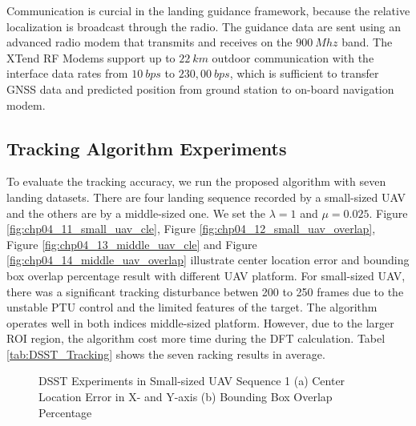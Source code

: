 \documentclass[journal,article,submit,moreauthors,pdftex,10pt,a4paper]{mdpi}
\begin{document}
Communication is curcial in the landing guidance framework, because the relative localization is broadcast through the radio. The guidance data are sent using an advanced radio modem that transmits and receives on the $900\ Mhz$ band. The XTend RF Modems support up to $22\ km$ outdoor communication with the interface data rates from $10\ bps$ to $230,00\ bps$, which is sufficient to transfer GNSS data and predicted position from ground station to on-board navigation modem. 


\subsection{Tracking Algorithm Experiments}
To evaluate the tracking accuracy, we run the proposed algorithm with seven landing datasets. There are four landing sequence recorded by a small-sized UAV and the others are by a middle-sized one. We set the $\lambda=1$ and $\mu=0.025$. Figure \ref{fig:chp04_11_small_uav_cle}, Figure \ref{fig:chp04_12_small_uav_overlap}, Figure \ref{fig:chp04_13_middle_uav_cle} and Figure \ref{fig:chp04_14_middle_uav_overlap} illustrate center location error and bounding box overlap percentage result with different UAV platform. For small-sized UAV, there was a significant tracking disturbance betwen 200 to 250 frames due to the unstable PTU control and the limited features of the target. The algorithm operates well in both indices middle-sized platform. However, due to the larger ROI region, the algorithm cost more time during the DFT calculation. Tabel \ref{tab:DSST_Tracking} shows the seven racking results in average. 

\begin{figure}[!tb]
	\centering
	\caption{DSST Experiments in Small-sized UAV Sequence 1 (a) Center Location Error in X- and Y-axis  (b) Bounding Box Overlap Percentage}
\end{figure}
\end{document}
